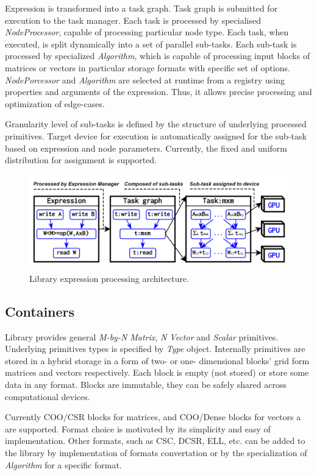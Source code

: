 Expression is transformed into a task graph. 
Task graph is submitted for execution to the task manager. 
Each task is processed by specialised \textit{NodeProcessor}, capable of processing particular node type.
Each task, when executed, is split dynamically into a set of parallel sub-tasks. 
Each sub-task is processed by specialized \textit{Algorithm}, which is capable of processing input blocks of matrices or vectors in particular storage formats with specific set of options. \textit{NodePorcessor} and \textit{Algorithm} are selected at runtime from a registry using properties and arguments of the expression. 
Thus, it allows precise processing and optimization of edge-cases.

Granularity level of sub-tasks is defined by the structure of underlying processed primitives. 
Target device for execution is automatically assigned for the sub-task based on expression and node parameters. 
Currently, the fixed and uniform distribution for assignment is supported.

\begin{figure}[t]
\includegraphics[width=0.99\linewidth]{figures/library_architecture.png}
\caption{Library expression processing architecture.}
\label{fig:architecture}
\end{figure}
    
\subsection{Containers}

Library provides general \textit{M-by-N Matrix}, \textit{N Vector} and \textit{Scalar} primitives.
Underlying primitives types is specified by \textit{Type} object. 
Internally primitives are stored in a hybrid storage in a form of two- or one- dimensional blocks' grid form matrices and vectors respectively. 
Each block is empty (not stored) or store some data in any format. Blocks are immutable, they can be safely shared across computational devices.

Currently COO/CSR blocks for matrices, and COO/Dense blocks for vectors a are supported. Format choice is motivated by its simplicity and easy of implementation. 
Other formats, such as CSC, DCSR, ELL, etc. can be added to the library by implementation of formats convertation or by the specialization of \textit{Algorithm} for a specific format.

